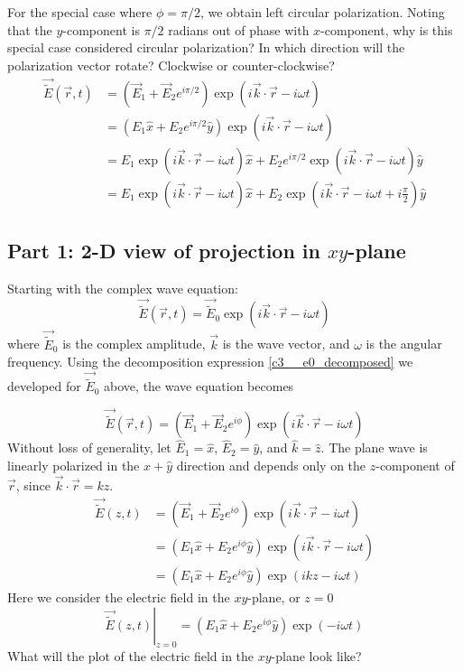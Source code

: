 \documentclass{article}
\begin{document}
For the special case where $\phi=\pi/2$, we obtain left circular polarization.  Noting that the $y$-component is $\pi/2$ radians out of phase with $x$-component, why is this special case considered circular polarization?  In which direction will the polarization vector rotate?  Clockwise or counter-clockwise?
\begin{align}
     \vec{\widetilde{E}}\left(\vec{r},t\right) &= \left(\vec{E}_1 + \vec{E}_2 e^{i\pi/2}\right) \exp \left(i \vec{k} \cdot \vec{r} - i \omega t\right)\\
     &= \left(E_1\hat{x} + E_2e^{i\pi/2}\hat{y}\right) \exp \left(i \vec{k} \cdot \vec{r} - i \omega t\right) \\
     &= E_1\exp \left(i \vec{k} \cdot \vec{r} - i \omega t\right)\hat{x} + E_2e^{i\pi/2}\exp \left(i \vec{k} \cdot \vec{r} - i \omega t\right)\hat{y} \\
     &= E_1\exp \left(i \vec{k} \cdot \vec{r} - i \omega t\right)\hat{x} + E_2\exp \left(i \vec{k} \cdot \vec{r} - i \omega t + i\frac{\pi}{2}\right)\hat{y}
\end{align}
\subsection{Part 1: 2-D view of projection in $xy$-plane}
Starting with the complex wave equation:
\begin{equation}
    \vec{\widetilde{E}}\left(\vec{r},t\right) = \vec{\widetilde{E}}_0 \exp \left(i \vec{k} \cdot \vec{r} - i \omega t\right)
\end{equation}
where $\vec{\widetilde{E}}_0$ is the complex amplitude, $\vec{k}$ is the wave vector, and $\omega$ is the angular frequency.  Using the decomposition expression \eqref{c3__e0_decomposed} we developed for $\vec{\widetilde{E}}_0$ above, the wave equation becomes

\begin{equation}
    \vec{\widetilde{E}}\left(\vec{r},t\right) = \left(\vec{E}_1 + \vec{E}_2e^{i\phi}\right) \exp \left(i \vec{k} \cdot \vec{r} - i \omega t\right)
\end{equation}
Without loss of generality, let $\hat{E}_1=\hat{x}$, $\hat{E}_2=\hat{y}$, and $\hat{k}=\hat{z}$.   The plane wave is linearly polarized in the $\hat{x}+\hat{y}$ direction and depends only on the $z$-component of $\vec r$, since $\vec{k} \cdot \vec{r} = kz$.
\begin{align}
     \vec{\widetilde{E}}\left(z,t\right) &= \left(\vec{E}_1 + \vec{E}_2e^{i\phi}\right) \exp \left(i \vec{k} \cdot \vec{r} - i \omega t\right)\\
     &= \left(E_1\hat{x} + E_2e^{i\phi}\hat{y}\right) \exp \left(i \vec{k} \cdot \vec{r} - i \omega t\right)\\
     &= \left(E_1\hat{x} + E_2e^{i\phi}\hat{y}\right) \exp \left(i kz - i \omega t\right) 
\end{align}
Here we consider the electric field in the $xy$-plane, or $z=0$
\begin{equation}
     \left.\vec{\widetilde{E}}\left(z,t\right)\right\rvert_{z=0} = \left(E_1\hat{x} + E_2e^{i\phi}\hat{y}\right) \exp \left(- i \omega t\right) 
\end{equation}
What will the plot of the electric field in the $xy$-plane look like?
\end{document}
